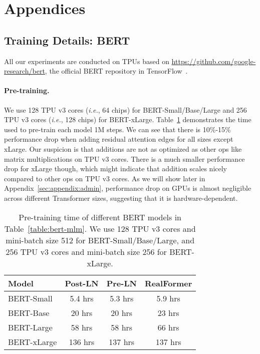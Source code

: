 \documentclass[11pt,a4paper]{article}
\begin{document}





\newpage

\appendix

\section{Appendices} 
\label{sec:appendix}

\subsection{Training Details: BERT}  \label{sec:appendix:bert}
All our experiments are conducted on TPUs based on \url{https://github.com/google-research/bert}, the official BERT repository in TensorFlow~\cite{Abadi-2016-tensorflow}.

\paragraph{Pre-training.} 
We use 128 TPU v3 cores (\emph{i.e.}, 64 chips) for BERT-Small/Base/Large and 256 TPU v3 cores (\emph{i.e.}, 128 chips) for BERT-xLarge. 
Table~\ref{table:bert-time} demonstrates the time used to pre-train each model 1M steps. We can see that there is 10\%-15\% performance drop when adding residual attention edges for all sizes except xLarge.
Our suspicion is that additions are not as optimized as other ops like matrix multiplications on TPU v3 cores.
There is a much smaller performance drop for xLarge though, which might indicate that addition scales nicely compared to other ops on TPU v3 cores.
As we will show later in Appendix~\ref{sec:appendix:admin}, performance drop on GPUs is almost negligible across different Transformer sizes, suggesting that it is hardware-dependent.


\begin{table}
\setlength{\tabcolsep}{3.5pt}
\centering
\begin{tabular}{l|ccc}
\hline \textbf{Model} & \textbf{Post-LN} & \textbf{Pre-LN} & \textbf{RealFormer} \\ \hline
BERT-Small  &5.4 hrs   &5.3 hrs    &5.9 hrs  \\
BERT-Base   &20 hrs    &20 hrs     &23 hrs   \\
BERT-Large  &58 hrs    &58 hrs     &66 hrs   \\
BERT-xLarge &136 hrs   &137 hrs    &137 hrs  \\
\hline
\end{tabular}
\caption{Pre-training time of different BERT models in Table~\ref{table:bert-mlm}. We use 128 TPU v3 cores and mini-batch size 512 for BERT-Small/Base/Large, and 256 TPU v3 cores and mini-batch size 256 for BERT-xLarge.}
\label{table:bert-time}
\end{table}
\end{document}
